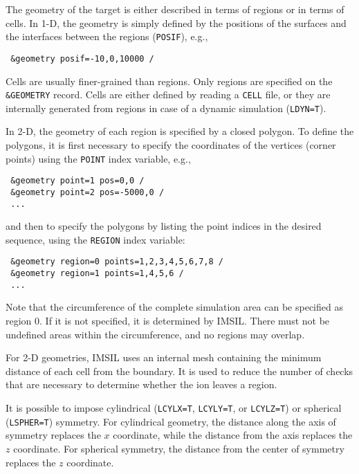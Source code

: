 The geometry of the target is either described in terms of regions or in terms 
of cells. In 1-D, the geometry is simply defined by the positions of the surfaces
and the interfaces between the regions (\texttt{POSIF}), e.g.,
%
\begin{verbatim}
 &geometry posif=-10,0,10000 /
\end{verbatim}
%
Cells are usually finer-grained than regions. Only regions are specified on the
\texttt{\&GEOMETRY} record. Cells are either defined by reading a \texttt{CELL}
file, or they are internally generated from regions in case of a dynamic
simulation (\texttt{LDYN=T}).

In 2-D, the geometry of each region is specified by a closed polygon. To define
the polygons, it is first necessary to specify the coordinates of the vertices
(corner points) using the \texttt{POINT} index variable, e.g.,
%
\begin{verbatim}
 &geometry point=1 pos=0,0 /
 &geometry point=2 pos=-5000,0 /
 ...
\end{verbatim}
%
and then to specify the polygons by listing the point indices in the desired
sequence, using the \texttt{REGION} index variable:
%
\begin{verbatim}
 &geometry region=0 points=1,2,3,4,5,6,7,8 /
 &geometry region=1 points=1,4,5,6 /
 ...
\end{verbatim}
%
Note that the circumference of the complete simulation area can be specified as
region 0. If it is not specified, it is determined by IMSIL. There must not be
undefined areas within the circumference, and no regions may overlap.

For 2-D geometries, IMSIL uses an internal mesh containing the minimum distance
of each cell from the boundary. It is used to reduce the number of checks that
are necessary to determine whether the ion leaves a region.

It is possible to impose cylindrical (\texttt{LCYLX=T}, \texttt{LCYLY=T}, or
\texttt{LCYLZ=T}) or spherical (\texttt{LSPHER=T}) symmetry. For cylindrical
geometry, the distance along the axis of symmetry replaces the $x$ coordinate,
while the distance from the axis replaces the $z$ coordinate. For spherical
symmetry, the distance from the center of symmetry replaces the $z$ coordinate. 

